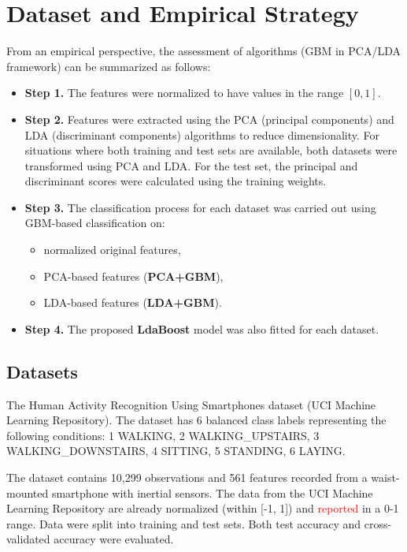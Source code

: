 \documentclass[11pt,a4paper]{article}
\providecommand{\DIFaddtex}[1]{\textcolor{red}{#1}} %
\providecommand{\DIFaddbegin}{} %
\providecommand{\DIFaddend}{} %
\providecommand{\DIFadd}[1]{\texorpdfstring{\DIFaddtex{#1}}{#1}} %
\begin{document}
\DIFaddend \section{Dataset and Empirical Strategy}
From an empirical perspective, the assessment of algorithms (GBM in PCA/LDA framework) can be summarized as follows:

\begin{itemize}
    \item \textbf{Step 1.} The features were normalized to have values in the range $[0,1]$.

    \item \textbf{Step 2.} Features were extracted using the PCA (principal components) and LDA (discriminant components) algorithms to reduce dimensionality.  
    For situations where both training and test sets are available, both datasets were transformed using PCA and LDA.  
    For the test set, the principal and discriminant scores were calculated using the training weights.

    \item \textbf{Step 3.} The classification process for each dataset was carried out using GBM-based classification on:
    \begin{itemize}
        \item normalized original features,
        \item PCA-based features (\textbf{PCA+GBM}),
        \item LDA-based features (\textbf{LDA+GBM}).
    \end{itemize}

    \item \textbf{Step 4.} The proposed \textbf{LdaBoost} model was also fitted for each dataset.
\end{itemize}


\subsection*{Datasets}
The Human Activity Recognition Using Smartphones dataset (UCI Machine Learning Repository). The dataset has 6 balanced class labels representing the following conditions: 1 WALKING, 2 WALKING\_UPSTAIRS, 3 WALKING\_DOWNSTAIRS, 4 SITTING, 5 STANDING, 6 LAYING.

The dataset contains 10,299 observations and 561 features recorded from a waist-mounted smartphone with inertial sensors. The data from the UCI Machine Learning Repository are already normalized (within [-1, 1]) and  \DIFaddbegin \DIFadd{reported }\DIFaddend in a 0-1 range. Data were split into training and test sets. Both test accuracy and cross-validated accuracy were evaluated.
\end{document}
